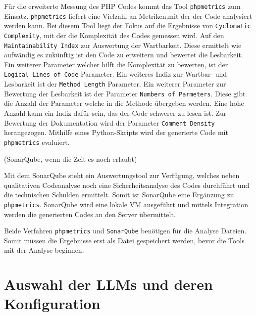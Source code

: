 Für die erweiterte Messung des PHP Codes kommt das Tool \texttt{phpmetrics} zum Einsatz. \texttt{phpmetrics} liefert eine Vielzahl an Metriken,mit der der Code analysiert werden kann. Bei diesem Tool liegt der Fokus auf die Ergebnisse von \texttt{Cyclomatic Complexity}, mit der die Komplexität des Codes gemessen wird. Auf den \texttt{Maintainability Index} zur Auswertung der Wartbarkeit. Diese ermittelt wie aufwändig es zukünftig ist den Code zu erweitern und bewertet die Lesbarkeit. Ein weiterer Parameter welcher hilft die Komplexität zu bewerten, ist der \texttt{Logical Lines of Code} Parameter. Ein weiteres Indiz zur Wartbar- und Lesbarkeit ist der \texttt{Method Length} Parameter. Ein weiterer Parameter zur Bewertung der Lesbarkeit ist der Parameter \texttt{Numbers of Parmeters}. Diese gibt die Anzahl der Parameter welche in die Methode übergeben werden. Eine hohe Anzahl kann ein Indiz dafür sein, das der Code schwerer zu lesen ist. Zur Bewertung der Dokumentation wird der Parameter \texttt{Comment Density} herangezogen.
Mithilfe eines Python-Skripts wird der generierte Code mit \texttt{phpmetrics} evaluiert.\vspace{0.2cm}

(SonarQube, wenn die Zeit es noch erlaubt)

Mit dem SonarQube steht ein Auswertungstool zur Verfügung, welches neben qualitativen Codeanalyse noch eine Sicherheitsanalyse des Codes durchführt und die technischen Schulden ermittelt. Somit ist SonarQube eine Ergänzung zu \texttt{phpmetrics}. SonarQube wird eine lokale VM ausgeführt und mittels Integration werden die generierten Codes an den Server übermittelt.\vspace{0.2cm}

Beide Verfahren \texttt{phpmetrics} und \texttt{SonarQube} benötigen für die Analyse Dateien. Somit müssen die Ergebnisse erst als Datei gespeichert werden, bevor die Tools mit der Analyse beginnen.



\section{Auswahl der LLMs und deren Konfiguration}


